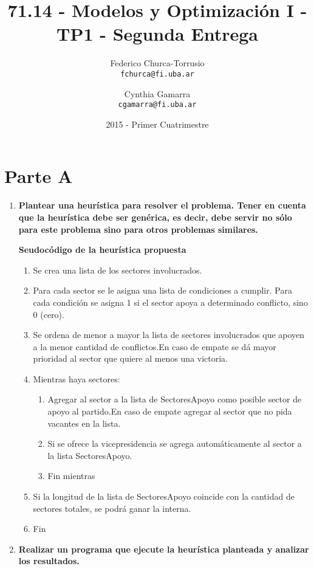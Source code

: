 \documentclass[10pt, a4paper, titlepage,
	oneside,
	fleqn, leqno]{article}
\title{71.14 - Modelos y Optimización I - TP1 - Segunda Entrega}
\author{
	Federico Churca-Torrusio \\\texttt{fchurca@fi.uba.ar}
	\and
	Cynthia Gamarra \\\texttt{cgamarra@fi.uba.ar}}
\date{2015 - Primer Cuatrimestre}
\let\oldsection\section
\def\section{\cleardoublepage\oldsection}
\begin{document}
\maketitle

\cleardoublepage
{}
\setcounter{page}{1}

\section{Parte A}
\begin{enumerate} [a .]
\item \textbf{Plantear una heurística para resolver el problema. Tener en cuenta que la heurística debe ser genérica, es decir, debe servir no sólo para este problema sino para otros problemas similares.}\\
\begin{center}
\textbf{Seudocódigo de la heurística propuesta}
\end{center}
\begin{enumerate}
\item Se crea una lista de los sectores involucrados.
\item Para cada sector se le asigna una lista de condiciones a cumplir. Para cada condición se asigna 1 si el sector apoya a determinado conflicto, sino 0 (cero).
\item Se ordena de menor a mayor la lista de sectores involucrados que apoyen a la menor cantidad de conflictos.En caso de empate se dá mayor prioridad al sector que quiere al menos una victoria.
\item Mientras haya sectores:
\begin{enumerate}
\item Agregar al sector a la lista de SectoresApoyo como posible sector de apoyo al partido.En caso de empate agregar al sector que no pida vacantes en la lista.
\item Si se ofrece la vicepresidencia se agrega automáticamente al sector a la lista SectoresApoyo.
\item Fin mientras
\end{enumerate}
\item Si la longitud de la lista de SectoresApoyo coincide con la cantidad de sectores totales, se podrá ganar la interna.
\item Fin
\end{enumerate}

\item \textbf{Realizar un programa que ejecute la heurística planteada y analizar los resultados.}
\end{enumerate}
\end{document}
